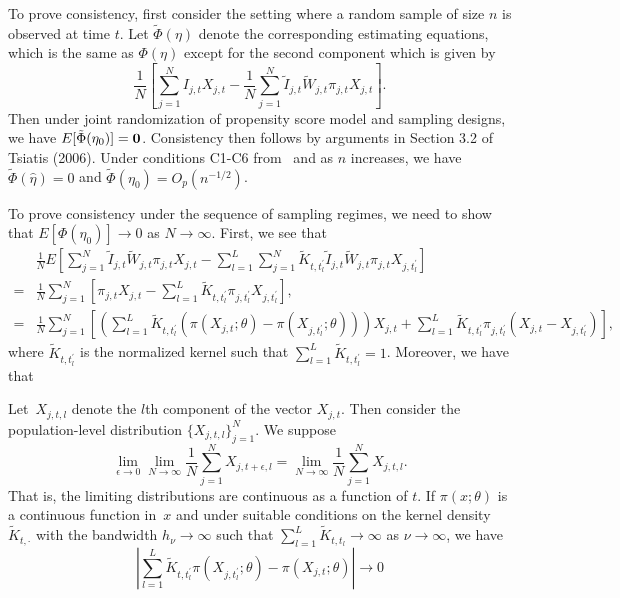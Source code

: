\documentclass[11pt]{amsart}
\numberwithin{equation}{section}
\theoremstyle{plain}
\begin{document}
To prove consistency, first consider the setting where a random sample of size $n$ is observed at time $t$.  Let $\tilde \Phi (\eta)$ denote the corresponding estimating equations, which is the same as $\Phi(\eta)$ except for the second component which is given by
$$
\frac{1}{N} \left[ \sum_{j=1}^N I_{j,t} X_{j,t} - \frac{1}{N} \sum_{j = 1}^N \tilde I_{j,t} \tilde W_{j,t}  \pi_{j,t} X_{j,t} \right].
$$
Then under joint randomization of propensity score model and sampling designs, we have $E [ \tilde \Phi (\eta_0) ] = {\bf 0}$.  Consistency then follows by arguments in Section 3.2 of Tsiatis (2006). Under conditions C1-C6 from~\cite{Chen2019} and as $n$ increases, we have $\tilde \Phi (\hat \eta) = 0$ and $\tilde \Phi(\eta_0) = O_p ( n^{-1/2} )$.

To prove consistency under the sequence of sampling regimes, we need to show that $E[ \Phi (\eta_0) ] \to 0$ as $N \to \infty$.  First, we see that
\begin{align*}
&\frac{1}{N}  E \left[ \sum_{j = 1}^N \tilde I_{j,t} \tilde W_{j,t}  \pi_{j,t} X_{j,t} - \sum_{l=1}^L  \sum_{j = 1}^N \tilde K_{t,t^\prime_l} \tilde I_{j,t} \tilde W_{j,t}  \pi_{j,t} X_{j,t^\prime_l} \right] \\
= &\frac{1}{N} \sum_{j = 1}^N \left[ \pi_{j,t} X_{j,t} - \sum_{l=1}^L \tilde K_{t,t^\prime_l} \pi_{j,t^\prime_l} X_{j,t^\prime_l} \right], \\
= &\frac{1}{N} \sum_{j = 1}^N \left[ \left( \sum_{l=1}^L \tilde K_{t,t^\prime_l}  \left( \pi (X_{j,t}; \theta) - \pi (X_{j,t^\prime_l}; \theta) \right) \right) X_{j,t} + \sum_{l=1}^L \tilde K_{t,t^\prime_l} \pi_{j,t^\prime_l} (X_{j,t} - X_{j,t^\prime_l} ) \right],
\end{align*}
where $\tilde K_{t, t^\prime_l}$ is the normalized kernel such that $\sum_{l=1}^L \tilde K_{t, t^\prime_l} = 1$.  Moreover, we have that

Let~$X_{j,t,l}$ denote the $l$th component of the vector $X_{j,t}$.  Then consider the population-level distribution $\{ X_{j,t,l} \}_{j=1}^N$.  We suppose
$$
\lim_{\epsilon \to 0} \lim_{N \to \infty} \frac{1}{N} \sum_{j=1}^N X_{j,t+\epsilon, l}  = \lim_{N \to \infty} \frac{1}{N} \sum_{j=1}^N X_{j,t, l}.
$$
That is, the limiting distributions are continuous as a function of $t$. If $\pi(x; \theta)$ is a continuous function in~$x$ and under suitable conditions on the kernel density~$\tilde K_{t, \cdot}$ with the bandwidth $h_\nu \to \infty$ such that $\sum_{l=1}^L \tilde K_{t,t_l} \to \infty$ as $\nu \to \infty$, we have
$$
\left | \sum_{l=1}^L \tilde K_{t, t_l^\prime} \pi (X_{j, t_l^\prime}; \theta) - \pi (X_{j, t}; \theta) \right|  \to 0
$$
\end{document}
